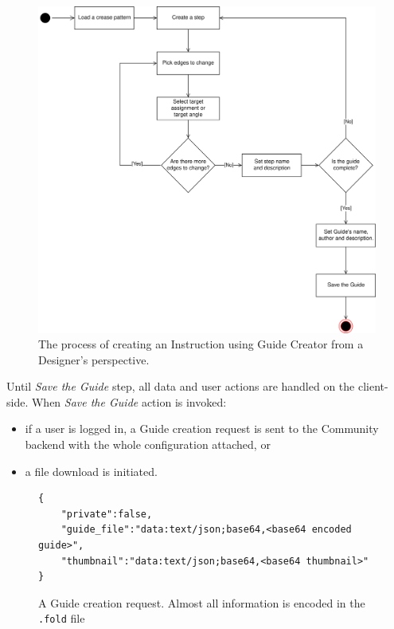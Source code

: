 \begin{figure}[H]
  \caption{The process of creating an Instruction using Guide Creator from a Designer's perspective.}
  \label{3-designer-creator-flow}
  \centering
    \includegraphics[width=\textwidth]{assets/3-designer-creator-flow.png}
\end{figure}

Until \textit{Save the Guide} step, all data and user actions are handled on the client-side. When \textit{Save the Guide} action is invoked:

\begin{itemize}
	\item if a user is logged in, a Guide creation request is sent to the Community backend with the whole configuration attached, or
	\item a file download is initiated.
\end{itemize}

\begin{figure}[H]
	\caption{A Guide creation request. Almost all information is encoded in the \texttt{.fold} file}
	\begin{lstlisting}
{
	"private":false,
	"guide_file":"data:text/json;base64,<base64 encoded guide>",
	"thumbnail":"data:text/json;base64,<base64 thumbnail>"
}
	\end{lstlisting}
\end{figure}

